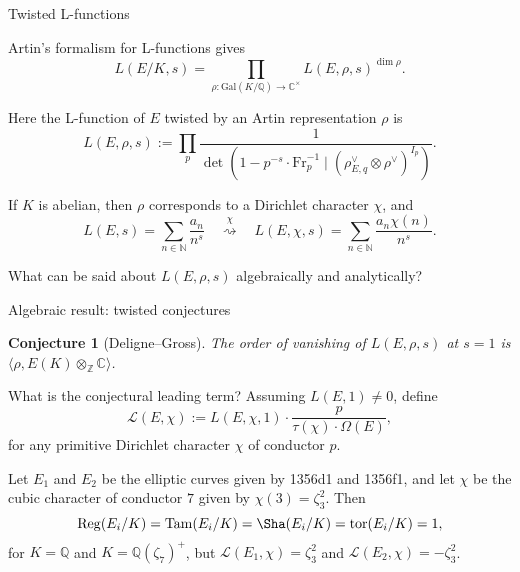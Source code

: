 \documentclass[10pt]{beamer}
\newtheorem{conjecture}{Conjecture}
\begin{document}
\begin{frame}[t]{Twisted L-functions}

Artin's formalism for L-functions gives $$ L(E / K, s) = \prod_{\rho : \mathrm{Gal}(K / \mathbb{Q}) \to \mathbb{C}^\times} L(E, \rho, s)^{\dim\rho}. $$

\pause

Here the L-function of $ E $ twisted by an Artin representation $ \rho $ is $$ L(E, \rho, s) := \prod_p \dfrac{1}{\det(1 - p^{-s} \cdot \mathrm{Fr}_p^{-1} \mid (\rho_{E, q}^\vee \otimes \rho^\vee)^{I_p})}. $$

\pause

If $ K $ is abelian, then $ \rho $ corresponds to a Dirichlet character $ \chi $, and $$ L(E, s) = \sum_{n \in \mathbb{N}} \dfrac{a_n}{n^s} \quad \overset{\chi}{\rightsquigarrow} \quad L(E, \chi, s) = \sum_{n \in \mathbb{N}} \dfrac{a_n\chi(n)}{n^s}. $$

\pause

\vspace{0.5cm} What can be said about $ L(E, \rho, s) $ algebraically and analytically?

\end{frame}

\begin{frame}[t]{Algebraic result: twisted conjectures}

\begin{conjecture}[Deligne--Gross]
The order of vanishing of $ L(E, \rho, s) $ at $ s = 1 $ is $ \langle\rho, E(K) \otimes_\mathbb{Z} \mathbb{C}\rangle $.
\end{conjecture}

\pause

\vspace{0.5cm} What is the conjectural leading term? Assuming $ L(E, 1) \ne 0 $, define $$ \mathcal{L}(E, \chi) := L(E, \chi, 1) \cdot \dfrac{p}{\tau(\chi) \cdot \Omega(E)}, $$ for any primitive Dirichlet character $ \chi $ of conductor $ p $.

\pause

\begin{example}
Let $ E_1 $ and $ E_2 $ be the elliptic curves given by 1356d1 and 1356f1, and let $ \chi $ be the cubic character of conductor $ 7 $ given by $ \chi(3) = \zeta_3^2 $. Then $$ \mathrm{Reg}(E_i / K) = \mathrm{Tam}(E_i / K) = \Sha(E_i / K) = \mathrm{tor}(E_i / K) = 1, $$ for $ K = \mathbb{Q} $ and $ K = \mathbb{Q}(\zeta_7)^+ $, but $ \mathcal{L}(E_1, \chi) = \zeta_3^2 $ and $ \mathcal{L}(E_2, \chi) = -\zeta_3^2 $.
\end{example}

\end{frame}
\end{document}
